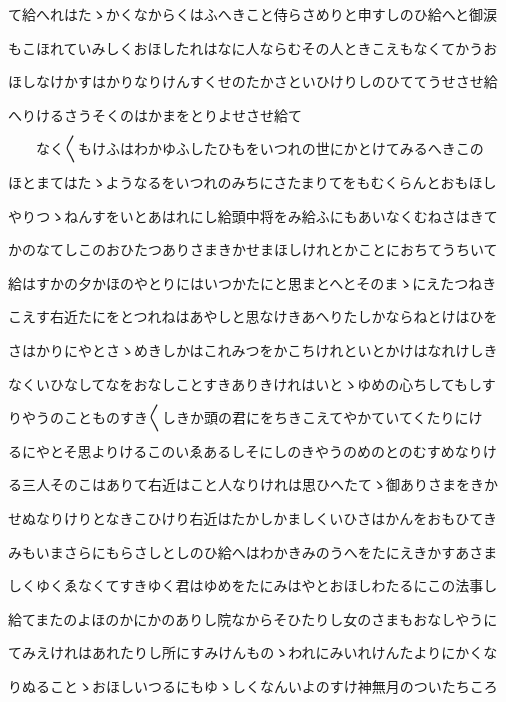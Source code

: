 \documentclass[a4paper,11pt,landscape]{ltjtarticle}
\begin{document}
\par\medskip
て給へれはたゝかくなからくはふへきこと侍らさめりと申すしのひ給へと御涙
\par\medskip
もこほれていみしくおほしたれはなに人ならむその人ときこえもなくてかうお
\par\medskip
ほしなけかすはかりなりけんすくせのたかさといひけりしのひててうせさせ給
\par\medskip
へりけるさうそくのはかまをとりよせさせ給て
\par\medskip
　　なく〱もけふはわかゆふしたひもをいつれの世にかとけてみるへきこの
\par\medskip
ほとまてはたゝようなるをいつれのみちにさたまりてをもむくらんとおもほし
\par\medskip
やりつゝねんすをいとあはれにし給頭中将をみ給ふにもあいなくむねさはきて
\par\medskip
かのなてしこのおひたつありさまきかせまほしけれとかことにおちてうちいて
\par\medskip
給はすかの夕かほのやとりにはいつかたにと思まとへとそのまゝにえたつねき
\par\medskip
こえす右近たにをとつれねはあやしと思なけきあへりたしかならねとけはひを
\par\medskip
さはかりにやとさゝめきしかはこれみつをかこちけれといとかけはなれけしき
\par\medskip
なくいひなしてなをおなしことすきありきけれはいとゝゆめの心ちしてもしす
\par\medskip
りやうのことものすき〱しきか頭の君にをちきこえてやかていてくたりにけ
\par\medskip
るにやとそ思よりけるこのいゑあるしそにしのきやうのめのとのむすめなりけ
\par\medskip
る三人そのこはありて右近はこと人なりけれは思ひへたてゝ御ありさまをきか
\par\medskip
せぬなりけりとなきこひけり右近はたかしかましくいひさはかんをおもひてき
\par\medskip
みもいまさらにもらさしとしのひ給へはわかきみのうへをたにえきかすあさま
\par\medskip
しくゆくゑなくてすきゆく君はゆめをたにみはやとおほしわたるにこの法事し
\par\medskip
給てまたのよほのかにかのありし院なからそひたりし女のさまもおなしやうに
\par\medskip
てみえけれはあれたりし所にすみけんものゝわれにみいれけんたよりにかくな
\par\medskip
りぬることゝおほしいつるにもゆゝしくなんいよのすけ神無月のついたちころ
\par\medskip
\end{document}
